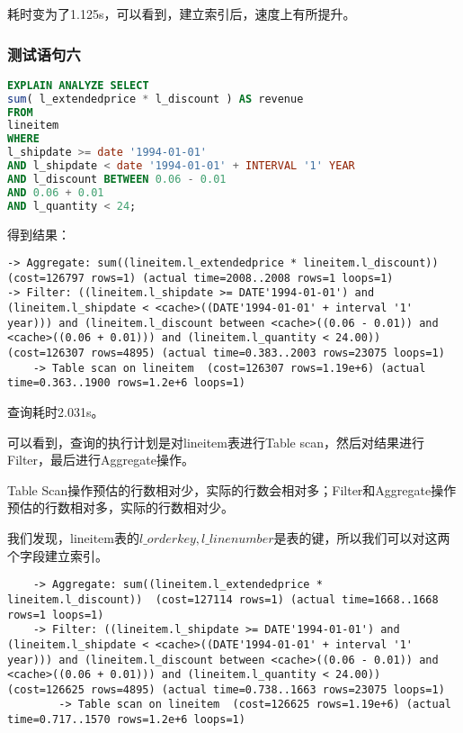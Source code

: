 \documentclass{article}
\begin{document}
耗时变为了1.125s，可以看到，建立索引后，速度上有所提升。

\subsubsection{测试语句六}

\begin{lstlisting}[language=sql]
EXPLAIN ANALYZE SELECT
sum( l_extendedprice * l_discount ) AS revenue 
FROM
lineitem 
WHERE
l_shipdate >= date '1994-01-01' 
AND l_shipdate < date '1994-01-01' + INTERVAL '1' YEAR 
AND l_discount BETWEEN 0.06 - 0.01 
AND 0.06 + 0.01 
AND l_quantity < 24;
\end{lstlisting}

得到结果：

\begin{lstlisting}
-> Aggregate: sum((lineitem.l_extendedprice * lineitem.l_discount))  (cost=126797 rows=1) (actual time=2008..2008 rows=1 loops=1)
-> Filter: ((lineitem.l_shipdate >= DATE'1994-01-01') and (lineitem.l_shipdate < <cache>((DATE'1994-01-01' + interval '1' year))) and (lineitem.l_discount between <cache>((0.06 - 0.01)) and <cache>((0.06 + 0.01))) and (lineitem.l_quantity < 24.00))  (cost=126307 rows=4895) (actual time=0.383..2003 rows=23075 loops=1)
    -> Table scan on lineitem  (cost=126307 rows=1.19e+6) (actual time=0.363..1900 rows=1.2e+6 loops=1)
\end{lstlisting}

查询耗时2.031s。

可以看到，查询的执行计划是对lineitem表进行Table scan，然后对结果进行Filter，最后进行Aggregate操作。

Table Scan操作预估的行数相对少，实际的行数会相对多；Filter和Aggregate操作预估的行数相对多，实际的行数相对少。

我们发现，lineitem表的$l\_orderkey,l\_linenumber$是表的键，所以我们可以对这两个字段建立索引。

\begin{lstlisting}
    -> Aggregate: sum((lineitem.l_extendedprice * lineitem.l_discount))  (cost=127114 rows=1) (actual time=1668..1668 rows=1 loops=1)
    -> Filter: ((lineitem.l_shipdate >= DATE'1994-01-01') and (lineitem.l_shipdate < <cache>((DATE'1994-01-01' + interval '1' year))) and (lineitem.l_discount between <cache>((0.06 - 0.01)) and <cache>((0.06 + 0.01))) and (lineitem.l_quantity < 24.00))  (cost=126625 rows=4895) (actual time=0.738..1663 rows=23075 loops=1)
        -> Table scan on lineitem  (cost=126625 rows=1.19e+6) (actual time=0.717..1570 rows=1.2e+6 loops=1)
\end{lstlisting}
\end{document}
